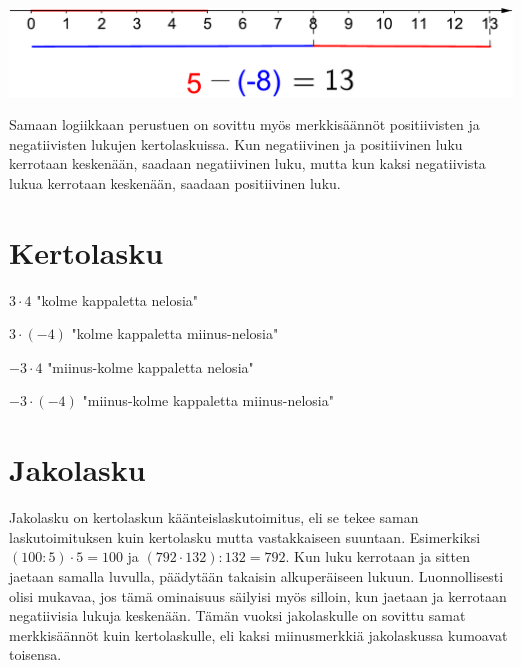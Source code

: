     \begin{center}
    \includegraphics[scale=0.5]{01-luvut/kuvia/5miinusmiinus8on13-crop.pdf}
    \end{center}
    
    Samaan logiikkaan perustuen on sovittu myös merkkisäännöt positiivisten ja negatiivisten lukujen kertolaskuissa. Kun negatiivinen ja positiivinen luku kerrotaan keskenään, saadaan negatiivinen luku, mutta kun kaksi negatiivista lukua kerrotaan keskenään, saadaan positiivinen luku.

\section{Kertolasku}

    $3 \cdot 4$ "kolme kappaletta nelosia"
    
    
    $3 \cdot (-4)$ "kolme kappaletta miinus-nelosia"
    
    
    $-3 \cdot 4$ "miinus-kolme kappaletta nelosia"
    
    
    $-3 \cdot (-4)$ "miinus-kolme kappaletta miinus-nelosia"
    

\section{Jakolasku}

    Jakolasku on kertolaskun käänteislaskutoimitus, eli se tekee
    saman laskutoimituksen kuin kertolasku mutta vastakkaiseen suuntaan.
    Esimerkiksi
    $(100:5) \cdot 5=100$ ja $(792 \cdot 132):132=792$. Kun luku kerrotaan 
    ja sitten jaetaan samalla luvulla, päädytään takaisin alkuperäiseen lukuun.
    Luonnollisesti olisi mukavaa, jos tämä ominaisuus säilyisi myös
    silloin, kun jaetaan ja kerrotaan negatiivisia lukuja keskenään. Tämän
    vuoksi jakolaskulle
    on sovittu samat merkkisäännöt kuin kertolaskulle, eli kaksi miinusmerkkiä
    jakolaskussa kumoavat toisensa.
    
